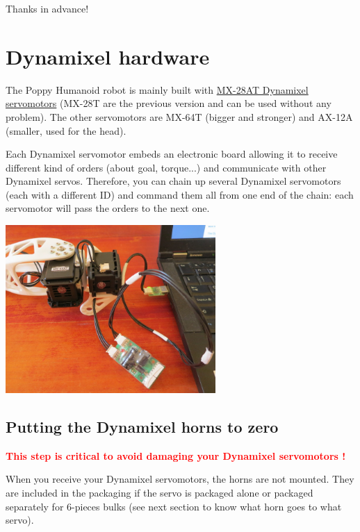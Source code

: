 \documentclass[includefoot]{article}
\begin{document}
Thanks in advance!

\section{Dynamixel hardware}
\label{dynamixel-hardware}

The Poppy Humanoid robot is mainly built with \href{http://www.generationrobots.com/en/401858-servomotor-dynamixel-mx-28at.html}{MX-28AT Dynamixel servomotors} (MX-28T are the previous version and can be used without any problem). The other servomotors are MX-64T (bigger and stronger) and AX-12A (smaller, used for the head).

Each Dynamixel servomotor embeds an electronic board allowing it to receive different kind of orders (about goal, torque...) and communicate with other Dynamixel servos. Therefore, you can chain up several Dynamixel servomotors (each with a different ID) and command them all from one end of the chain: each servomotor will pass the orders to the next one. 

 \begin{center}
  \includegraphics[width=0.6\textwidth]{img/daisy_link}
 \end{center}
 

\subsection{Putting the Dynamixel horns to zero}
\label{dynamixel-zero}

\textcolor{red}{\textbf{This step is critical to avoid damaging your Dynamixel servomotors !}}

When you receive your Dynamixel servomotors, the horns are not mounted. They are included in the packaging if the servo is packaged alone or packaged separately for 6-pieces bulks (see next section to know what horn goes to what servo).
\end{document}
